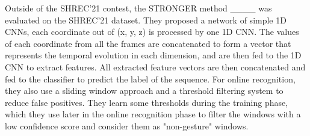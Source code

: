 Outside of the SHREC'21 contest, the STRONGER method ____ was evaluated on the SHREC'21 dataset. They proposed a network of simple 1D CNNs, each coordinate out of (x, y, z) is processed by one 1D CNN. The values of each coordinate from all the frames are concatenated to form a vector that represents the temporal evolution in each dimension, and are then fed to the 1D CNN to extract features. All extracted feature vectors are then concatenated and fed to the classifier to predict the label of the sequence. For online recognition, they also use a sliding window approach and a threshold filtering system to reduce false positives. They learn some thresholds during the training phase, which they use later in the online recognition phase to filter the windows with a low confidence score and consider them as "non-gesture" windows.
